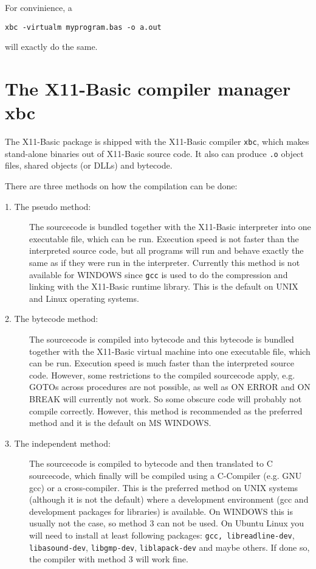 For convinience, a
\begin{mdframed}[hidealllines=true,backgroundcolor=black!20]
\begin{verbatim}
xbc -virtualm myprogram.bas -o a.out
\end{verbatim}
\end{mdframed}
will exactly do the same. 
  
\section{The X11-Basic compiler manager {\bf xbc}}

The X11-Basic package is shipped with the X11-Basic compiler \verb|xbc|, which
makes stand-alone binaries out of X11-Basic source code. It also can produce
\verb|.o| object files, shared objects (or DLLs) and bytecode. 

There are three methods on how the compilation can be done:
\begin{description}
\item[1. The pseudo method:] The sourcecode is bundled together with the
X11-Basic interpreter into one executable file, which can be run. Execution
speed is not faster than the interpreted source code, but all programs will run
and behave exactly the same as if they were run in the interpreter. Currently
this method is not available for WINDOWS since \verb|gcc| is used to do the
compression and linking with the X11-Basic runtime library. This is the default 
on UNIX and Linux operating systems.
\item[2. The bytecode method:] The sourcecode is compiled into bytecode and this
bytecode is bundled together with the X11-Basic virtual machine into one
executable file, which can be run. Execution speed is much faster than the
interpreted source code. However,
some restrictions to the compiled sourcecode apply, e.g. GOTOs across procedures
are not possible, as well as ON ERROR and ON BREAK will currently not work. So some
obscure code will probably not compile correctly. However, this method is
recommended as the preferred method and it is the default on MS WINDOWS.
\item[3. The independent method:] The sourcecode is compiled to bytecode and
then translated to C sourcecode, which finally will be compiled using a
C-Compiler (e.g. GNU gcc) or a cross-compiler. This is the preferred method on
UNIX systems (although it is not the default) where a development environment
(gcc and development packages for libraries) is available. On WINDOWS this is
usually not the case, so method 3 can not be used. On Ubuntu Linux you will need
to install at least following packages:  
\verb|gcc, libreadline-dev|, \verb|libasound-dev|, \verb|libgmp-dev|,  \verb|liblapack-dev|
and maybe others. If done so, the compiler with method 3 will work fine.
\end{description}

